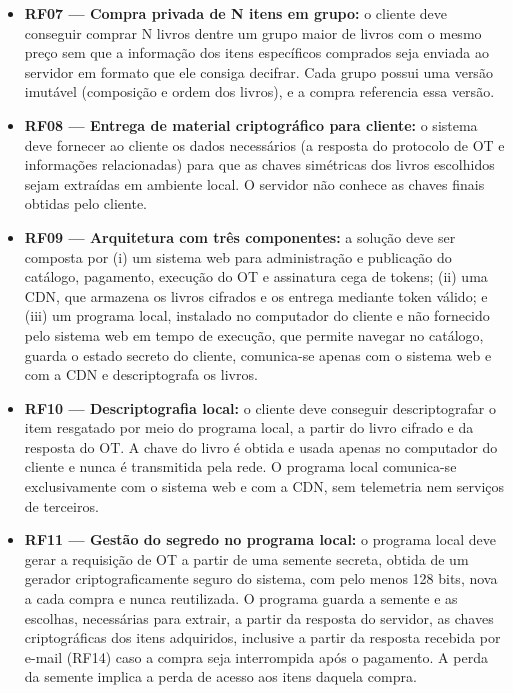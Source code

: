 \begin{itemize}
\item \textbf{RF07 --- Compra privada de N itens em grupo:} o cliente deve
conseguir comprar N livros dentre um grupo maior de livros com o mesmo preço
sem que a informação dos itens específicos comprados seja enviada ao servidor
em formato que ele consiga decifrar. Cada grupo possui uma versão imutável
(composição e ordem dos livros), e a compra referencia essa versão.

\item \textbf{RF08 --- Entrega de material criptográfico para cliente:} o
sistema deve fornecer ao cliente os dados necessários (a resposta do
protocolo de OT e informações relacionadas) para que as chaves simétricas dos
livros escolhidos sejam extraídas em ambiente local. O servidor não conhece as
chaves finais obtidas pelo cliente.

\item \textbf{RF09 --- Arquitetura com três componentes:} a solução deve ser
composta por (i) um sistema web para administração e publicação do catálogo,
pagamento, execução do OT e assinatura cega de tokens; (ii) uma CDN, que
armazena os livros cifrados e os entrega mediante token válido; e (iii) um
programa local, instalado no computador do cliente e não fornecido pelo
sistema web em tempo de execução, que permite navegar no catálogo, guarda o
estado secreto do cliente, comunica-se apenas com o sistema web e com a CDN e
descriptografa os livros.

\item \textbf{RF10 --- Descriptografia local:} o cliente deve conseguir
descriptografar o item resgatado por meio do programa local, a partir do livro
cifrado e da resposta do OT. A chave do livro é obtida e usada apenas no
computador do cliente e nunca é transmitida pela rede. O programa local
comunica-se exclusivamente com o sistema web e com a CDN, sem telemetria nem
serviços de terceiros.

\item \textbf{RF11 --- Gestão do segredo no programa local:} o programa local
deve gerar a requisição de OT a partir de uma semente secreta, obtida de um
gerador criptograficamente seguro do sistema, com pelo menos 128 bits, nova a
cada compra e nunca reutilizada. O programa guarda a semente e as escolhas,
necessárias para extrair, a partir da resposta do servidor, as chaves
criptográficas dos itens adquiridos, inclusive a partir da resposta recebida
por e-mail (RF14) caso a compra seja interrompida após o pagamento. A perda da
semente implica a perda de acesso aos itens daquela compra.


\end{itemize}
